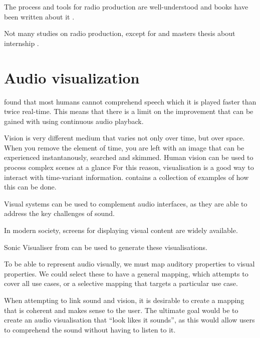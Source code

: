 The process and tools for radio production are well-understood and books have been written about it
\citep{McLeish2015,Hausman2012}.

Not many studies on radio production, except for \citet{Barbour2004} and masters thesis about internship
\citet{Sampaio2016}.

\section{Audio visualization}\label{sec:background-visualization}

\citet{Arons1997} found that most humans cannot comprehend speech which it is played faster than twice real-time. This
means that there is a limit on the improvement that can be gained with using continuous audio playback.

Vision is very different medium that varies not only over time, but over space. When you remove the element of time,
you are left with an image that can be experienced instantanously, searched and skimmed.  Human vision can be used to
process complex scenes at a glance
For this reason, visualisation is a good way to interact with time-variant information.  \citet{Aigner2011} contains a
collection of examples of how this can be done.

Visual systems can be used to complement audio interfaces, as they are able to address the key challenges of sound.

In modern society, screens for displaying visual content are widely available.

Sonic Visualiser from \citet{Cannam2010} can be used to generate these visualisations.

To be able to represent audio visually, we must map auditory properties to visual properties. We could select these 
to have a general mapping, which attempts to cover all use cases, or a selective mapping that targets a particular use
case.

When attempting to link sound and vision, it is desirable to create a mapping that is coherent and makes sense to the
user. The ultimate goal would be to create an audio visualisation that ``look likes it sounds'', as this would
allow users to comprehend the sound without having to listen to it.


